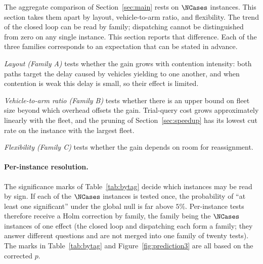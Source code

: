 The aggregate comparison of Section~\ref{sec:main} rests on $\NCases$ instances. This section takes them apart by layout, vehicle-to-arm ratio, and flexibility.
The trend of the closed loop can be read by family; dispatching cannot be distinguished from zero on any single instance. This section reports that difference. Each of the three families corresponds to an expectation that can be stated in advance.

\emph{Layout (Family A)} tests whether the gain grows with contention intensity: both paths target the delay caused by vehicles yielding to one another, and when contention is weak this delay is small, so their effect is limited.

\emph{Vehicle-to-arm ratio (Family B)} tests whether there is an upper bound on fleet size beyond which overhead offsets the gain. Trial-query cost grows approximately linearly with the fleet, and the pruning of Section~\ref{sec:speedup} has its lowest cut rate on the instance with the largest fleet.

\emph{Flexibility (Family C)} tests whether the gain depends on room for reassignment.

\paragraph{Per-instance resolution.}
The significance marks of Table~\ref{tab:bytag} decide which instances may be read by sign.
If each of the $\NCases$ instances is tested once, the probability of ``at least one significant'' under the global null is far above $5\%$.
Per-instance tests therefore receive a Holm correction by family, the family being the $\NCases$ instances of one effect (the closed loop and dispatching each form a family; they answer different questions and are not merged into one family of twenty tests).
The marks in Table~\ref{tab:bytag} and Figure~\ref{fig:prediction3} are all based on the corrected $p$.

